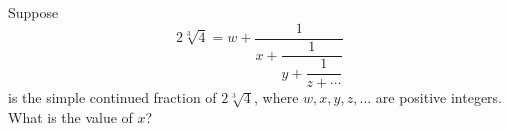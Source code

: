 Suppose
\[
2\sqrt[3]{4}=w+\dfrac{1}{x+\dfrac{1}{y+\dfrac{1}{z+\cdots}}}
\]
is the simple continued fraction of $2\sqrt[3]{4}$, where $w,x,y,z,\dots$ are positive integers. What is the value of $x$?

